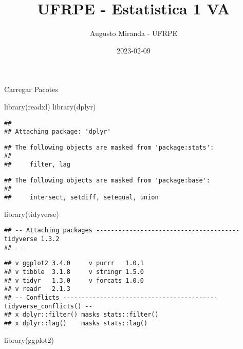 \documentclass[
]{article}
\title{UFRPE - Estatistica 1 VA}
\author{Augusto Miranda - UFRPE}
\date{2023-02-09}
\newenvironment{Shaded}{\begin{snugshade}}{\end{snugshade}}
\newcommand{\FunctionTok}[1]{\textcolor[rgb]{0.00,0.00,0.00}{#1}}
\newcommand{\NormalTok}[1]{#1}
\begin{document}
\maketitle

Carregar Pacotes

\begin{Shaded}
\begin{Highlighting}[]
\FunctionTok{library}\NormalTok{(readxl)}
\FunctionTok{library}\NormalTok{(dplyr)}
\end{Highlighting}
\end{Shaded}

\begin{verbatim}
## 
## Attaching package: 'dplyr'
\end{verbatim}

\begin{verbatim}
## The following objects are masked from 'package:stats':
## 
##     filter, lag
\end{verbatim}

\begin{verbatim}
## The following objects are masked from 'package:base':
## 
##     intersect, setdiff, setequal, union
\end{verbatim}

\begin{Shaded}
\begin{Highlighting}[]
\FunctionTok{library}\NormalTok{(tidyverse)}
\end{Highlighting}
\end{Shaded}

\begin{verbatim}
## -- Attaching packages --------------------------------------- tidyverse 1.3.2
## --
\end{verbatim}

\begin{verbatim}
## v ggplot2 3.4.0     v purrr   1.0.1
## v tibble  3.1.8     v stringr 1.5.0
## v tidyr   1.3.0     v forcats 1.0.0
## v readr   2.1.3     
## -- Conflicts ------------------------------------------ tidyverse_conflicts() --
## x dplyr::filter() masks stats::filter()
## x dplyr::lag()    masks stats::lag()
\end{verbatim}

\begin{Shaded}
\begin{Highlighting}[]
\FunctionTok{library}\NormalTok{(ggplot2)}
\end{Highlighting}
\end{Shaded}
\end{document}
